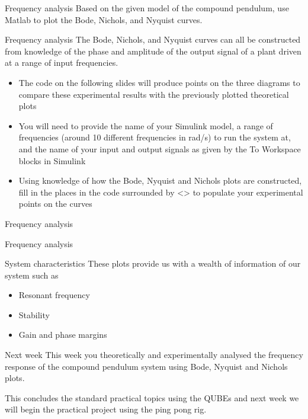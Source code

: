 \documentclass[9pt]{beamer-control}
\begin{document}

\begin{frame}{Frequency analysis}
Based on the given model of the compound pendulum, use Matlab to plot the Bode, Nichols, and Nyquist curves.


\end{frame}


\begin{frame}{Frequency analysis}
The Bode, Nichols, and Nyquist curves can all be constructed from knowledge of the phase and amplitude of the output signal of a plant driven at a range of input frequencies. 

\begin{itemize}
	\item The code on the following slides will produce points on the three diagrams to compare these experimental results with the previously plotted theoretical plots
	\item You will need to provide the name of your Simulink model, a range of frequencies (around 10 different frequencies in rad/s) to run the system at, and the name of your input and output signals as given by the To Workspace blocks in Simulink
	\item Using knowledge of how the Bode, Nyquist and Nichols plots are constructed, fill in the places in the code surrounded by <> to populate your experimental points on the curves
\end{itemize}
 
\end{frame}

\begin{frame}{Frequency analysis}
\end{frame}

\begin{frame}{Frequency analysis}
\end{frame}


\begin{frame}{System characteristics}
These plots provide us with a wealth of information of our system such as 
\begin{itemize}
	\item Resonant frequency
	\item Stability 
	\item Gain and phase margins
\end{itemize}
\end{frame}


\begin{frame}{Next week}
	This week you theoretically and experimentally analysed the frequency response of the compound pendulum system using Bode, Nyquist and Nichols plots. 
	
	This concludes the standard practical topics using the QUBEs and next week we will begin the practical project using the ping pong rig.
\end{frame}
\end{document}
